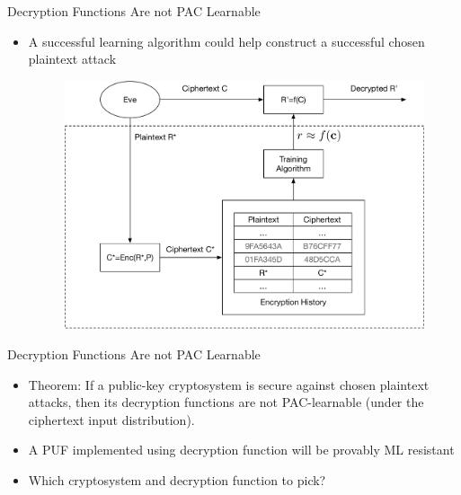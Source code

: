 \begin{frame}{Decryption Functions Are not PAC Learnable}
\begin{itemize}
    \item A successful learning algorithm could help construct a successful chosen plaintext attack
    \begin{figure}
    \centering
    \includegraphics[width=.8\linewidth]{fig/MLasDistinguisher.pdf}
    \end{figure}
\end{itemize}    
\end{frame}

\begin{frame}{Decryption Functions Are not PAC Learnable}
\begin{itemize}
    \item Theorem: If a public-key cryptosystem is secure against chosen plaintext attacks, then its decryption functions are not PAC-learnable (under the ciphertext input distribution).
    \item A PUF implemented using decryption function will be provably ML resistant 
    \item Which cryptosystem and decryption function to pick?
\end{itemize}
\end{frame}

